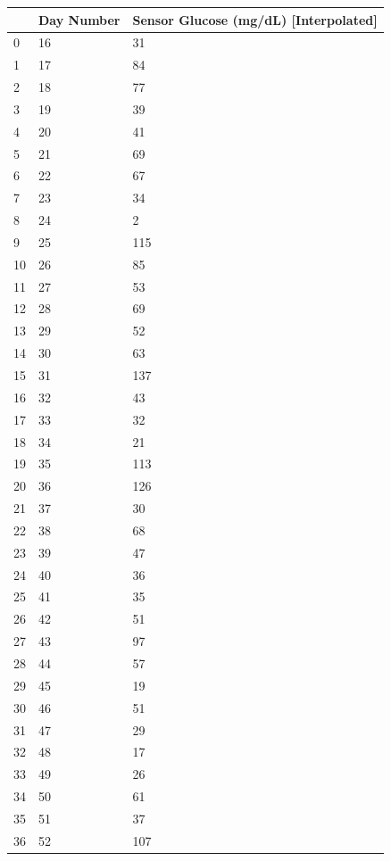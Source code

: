\bigskip\noindent
\begin{tabular}{p{}p{}p{}}
\toprule
 & Day Number & Sensor Glucose (mg/dL) [Interpolated] \\
\hline
0 & 16 & 31 \\
\hline
1 & 17 & 84 \\
\hline
2 & 18 & 77 \\
\hline
3 & 19 & 39 \\
\hline
4 & 20 & 41 \\
\hline
5 & 21 & 69 \\
\hline
6 & 22 & 67 \\
\hline
7 & 23 & 34 \\
\hline
8 & 24 & 2 \\
\hline
9 & 25 & 115 \\
\hline
10 & 26 & 85 \\
\hline
11 & 27 & 53 \\
\hline
12 & 28 & 69 \\
\hline
13 & 29 & 52 \\
\hline
14 & 30 & 63 \\
\hline
15 & 31 & 137 \\
\hline
16 & 32 & 43 \\
\hline
17 & 33 & 32 \\
\hline
18 & 34 & 21 \\
\hline
19 & 35 & 113 \\
\hline
20 & 36 & 126 \\
\hline
21 & 37 & 30 \\
\hline
22 & 38 & 68 \\
\hline
23 & 39 & 47 \\
\hline
24 & 40 & 36 \\
\hline
25 & 41 & 35 \\
\hline
26 & 42 & 51 \\
\hline
27 & 43 & 97 \\
\hline
28 & 44 & 57 \\
\hline
29 & 45 & 19 \\
\hline
30 & 46 & 51 \\
\hline
31 & 47 & 29 \\
\hline
32 & 48 & 17 \\
\hline
33 & 49 & 26 \\
\hline
34 & 50 & 61 \\
\hline
35 & 51 & 37 \\
\hline
36 & 52 & 107 \\

\end{tabular}
